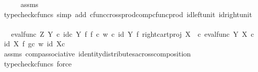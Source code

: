 \begin{isabellebody}
\ \ \ \ \isamarkupfalse%
\ assms\ \isamarkupfalse%
\ {\isacharparenleft}{\kern0pt}typecheck{\isacharunderscore}{\kern0pt}cfuncs{\isacharcomma}{\kern0pt}\ simp\ add{\isacharcolon}{\kern0pt}\ cfunc{\isacharunderscore}{\kern0pt}cross{\isacharunderscore}{\kern0pt}prod{\isacharunderscore}{\kern0pt}comp{\isacharunderscore}{\kern0pt}cfunc{\isacharunderscore}{\kern0pt}prod\ id{\isacharunderscore}{\kern0pt}left{\isacharunderscore}{\kern0pt}unit{}\ id{\isacharunderscore}{\kern0pt}right{\isacharunderscore}{\kern0pt}unit{}{\isacharparenright}{\kern0pt}\isanewline
\ \ \isamarkupfalse%
\ \isamarkupfalse%
\ {\isachardoublequoteopen}{\isachardot}{\kern0pt}{\isachardot}{\kern0pt}{\isachardot}{\kern0pt}\ {\isacharequal}{\kern0pt}\ {\isacharparenleft}{\kern0pt}eval{\isacharunderscore}{\kern0pt}func\ Z\ Y\ {\isasymcirc}\isactrlsub c\ {\isacharparenleft}{\kern0pt}id\isactrlsub c\ Y\ {\isasymtimes}\isactrlsub f\ {\isacharparenleft}{\kern0pt}f\ {\isasymcirc}\isactrlsub c\ w{\isacharparenright}{\kern0pt}{\isacharparenright}{\kern0pt}\ {\isasymcirc}\isactrlsub c\ {\isacharparenleft}{\kern0pt}id\ {\isacharparenleft}{\kern0pt}Y{\isacharparenright}{\kern0pt}\ {\isasymtimes}\isactrlsub f\ right{\isacharunderscore}{\kern0pt}cart{\isacharunderscore}{\kern0pt}proj\ X\ {\isasymone}{\isacharparenright}{\kern0pt}\ {\isasymcirc}\isactrlsub c\ {\isasymlangle}eval{\isacharunderscore}{\kern0pt}func\ Y\ X\ {\isasymcirc}\isactrlsub c\ {\isacharparenleft}{\kern0pt}id\ X\ {\isasymtimes}\isactrlsub f\ {\isacharparenleft}{\kern0pt}g{\isasymcirc}\isactrlsub c\ w{\isacharparenright}{\kern0pt}{\isacharparenright}{\kern0pt}{\isacharcomma}{\kern0pt}\ id\ {\isacharparenleft}{\kern0pt}X{\isasymtimes}\isactrlsub c\ {\isasymone}{\isacharparenright}{\kern0pt}{\isasymrangle}{\isacharparenright}{\kern0pt}\isactrlsup {\isasymsharp}{\isachardoublequoteclose}\isanewline
\ \ \ \ \isamarkupfalse%
\ assms\ comp{\isacharunderscore}{\kern0pt}associative{}\ identity{\isacharunderscore}{\kern0pt}distributes{\isacharunderscore}{\kern0pt}across{\isacharunderscore}{\kern0pt}composition\ \isamarkupfalse%
\ {\isacharparenleft}{\kern0pt}typecheck{\isacharunderscore}{\kern0pt}cfuncs{\isacharcomma}{\kern0pt}\ force{\isacharparenright}{\kern0pt}\isanewline
\ \ \isamarkupfalse%
\ \isamarkupfalse%

\end{isabellebody}
